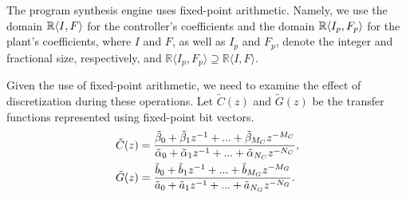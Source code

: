 \documentclass{sig-alternate-05-2015}
\begin{document}
The program synthesis engine uses fixed-point arithmetic.  Namely, we use
the domain $\mathbb{R}\langle{I},{F}\rangle$ for the controller's coefficients and
the domain $\mathbb{R}\langle{I_p},{F_p}\rangle$ for the plant's coefficients, 
where $I$ and $F$, as well as $I_p$ and $F_p$, denote the integer and
fractional size, respectively, and $\mathbb{R}\langle I_p,F_p \rangle
\supseteq \mathbb{R}\langle I,F \rangle$.
%

Given the use of fixed-point arithmetic, 
we need to examine the effect of discretization during these operations.
Let $\tilde C(z)$ and $\tilde G(z)$ be the transfer functions represented
using fixed-point bit vectors.%
%
\begin{align}
\small
\label{digital_controller_plant_tf}
\tilde C(z)&=\frac{\tilde \beta_{0}+\tilde \beta_{1}z^{-1}+...+\tilde \beta_{M_C}z^{-M_C}}{\tilde \alpha_{0}+\tilde \alpha_{1}z^{-1}+...+\tilde \alpha_{N_C}z^{-N_C}}, \\
\tilde G(z)&=\frac{\tilde b_{0}+\tilde b_{1}z^{-1}+...+\tilde b_{M_G}z^{-M_G}}{\tilde a_{0}+\tilde a_{1}z^{-1}+...+\tilde a_{N_G}z^{-N_G}}.
\end{align}
 
\end{document}
